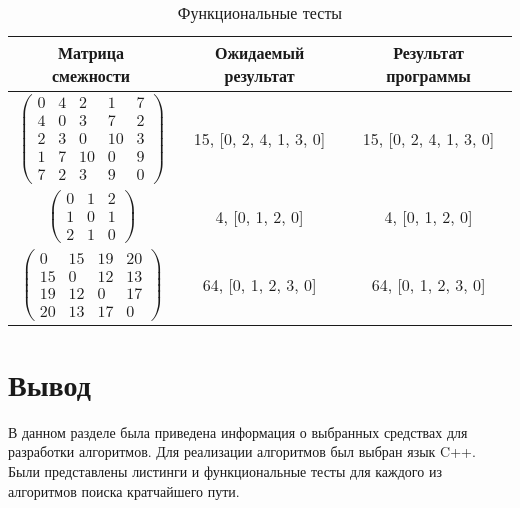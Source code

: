 \begin{table}[h!]
	\begin{center}
		\begin{threeparttable}
			\captionsetup{justification=raggedright,singlelinecheck=off}
			\caption{Функциональные тесты}
			\label{tests}
			\begin{tabular}{|c|c|c|}
				\hline
				Матрица смежности & Ожидаемый результат & Результат программы \\
				\hline
				$ \begin{pmatrix}
					0 &  4 &  2 &  1 & 7 \\
					4 &  0 &  3 &  7 & 2 \\
					2 &  3 &  0 & 10 & 3 \\
					1 &  7 & 10 &  0 & 9 \\
					7 &  2 &  3 &  9 & 0
				\end{pmatrix}$ &
				15, [0, 2, 4, 1, 3, 0] &
				15, [0, 2, 4, 1, 3, 0] \\
				\hline			
				$ \begin{pmatrix}
					0 & 1 & 2 \\
					1 & 0 & 1 \\
					2 & 1 & 0	
				\end{pmatrix}$ &
				4, [0, 1, 2, 0] &
				4, [0, 1, 2, 0] \\
				\hline			
				$ \begin{pmatrix}
					0 & 15 & 19 & 20 \\
					15 &  0 & 12 & 13 \\
					19 & 12 &  0 & 17 \\
					20 & 13 & 17 &  0
				\end{pmatrix}$ &
				64, [0, 1, 2, 3, 0] &
				64, [0, 1, 2, 3, 0] \\
				\hline
			\end{tabular}
		\end{threeparttable}	
	\end{center}
\end{table}

\section*{Вывод}
В данном разделе была приведена информация о выбранных средствах для разработки алгоритмов. 
Для реализации алгоритмов был выбран язык C++.
Были представлены листинги и функциональные тесты для каждого из алгоритмов поиска кратчайшего пути.